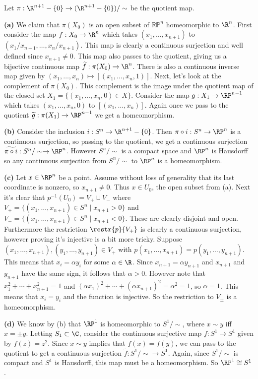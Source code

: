 \documentclass[11pt,letterpaper]{article}
\begin{document}
\begin{solution}
    Let $\pi : \R^{n+1}-\{0\} \to (\R^{n+1}-\{0\}) /\sim$ be the quotient map.

    \textbf{(a)} We claim that $\pi(X_0)$ is an open subset of $\mathbb{RP}^n$ homeomorphic to $\R^n$. First consider the map $f : X_0 \to \R^n$ which takes $(x_1,\ldots,x_{n+1})$ to $(x_1 / x_{n+1}, \ldots, x_n / x_{n+1})$. This map is clearly a continuous surjection and well defined since $x_{n+1}\neq 0$. This map also passes to the quotient, giving us a bijective continuous map $\widetilde{f} : \pi(X_0) \to \R^n$. There is also a continuous inverse map given by $(x_1,\ldots,x_n) \mapsto [(x_1,\ldots,x_n, 1)]$. Next, let's look at the complement of $\pi(X_0)$. This complement is the image under the quotient map of the closed set $X_1=\{(x_1,\ldots,x_n,0)\in X\}$. Consider the map $g : X_1 \to \RP^{n-1}$ which takes $(x_1,\ldots,x_n,0)$ to $[(x_1,\ldots,x_n)]$. Again once we pass to the quotient $\widetilde{g} : \pi(X_1) \to \RP^{n-1}$ we get a homeomorphism.    
    
    \textbf{(b)} Consider the inclusion $i : S^n \to \R^{n+1}-\{0\}$. Then $\pi\circ i : S^n \to \RP^n$ is a continuous surjection, so passing to the quotient, we get a continuous surjection $\widetilde{\pi\circ i} : S^n/\sim \to \RP^n$. However $S^n /\sim$ is a compact space and $\RP^n$ is Hausdorff so any continuous surjection from $S^n /\sim$ to $\RP^n$ is a homeomorphism.   
    
    \textbf{(c)} Let $x\in \RP^n$ be a point. Assume without loss of generality that its last coordinate is nonzero, so $x_{n+1}\neq 0$. Thus $x\in U_0$, the open subset from (a). Next it's clear that $p^{-1}(U_0)=V_+\sqcup V_-$ where $V_+=\{(x_1,\ldots,x_{n+1})\in S^n\mid x_{n+1}>0\}$ and $V_-=\{(x_1,\ldots,x_{n+1})\in S^n\mid x_{n+1}<0\}$. These are clearly disjoint and open. Furthermore the restriction $\restr{p}{V_+}$ is clearly a continuous surjection, however proving it's injective is a bit more tricky. Suppose $(x_1,\ldots,x_{n+1}), (y_1,\ldots,y_{n+1})\in V_+$ with $p(x_1,\ldots,x_{n+1})=p(y_1,\ldots,y_{n+1})$. This means that $x_i=\alpha y_{i}$ for some $\alpha\in \R$. Since $x_{n+1}=\alpha y_{n+1}$ and $x_{n+1}$ and $y_{n+1}$ have the same sign, it follows that $\alpha>0$. However note that $x_1^2+\cdots+x_{n+1}^2=1$ and $(\alpha x_1)^2+\cdots+(\alpha x_{n+1})^2=\alpha^2=1$, so $\alpha=1$. This means that $x_i=y_i$ and the function is injective. So the restriction to $V_\pm$ is a homeomorphism. 
    
    \textbf{(d)} We know by (b) that $\RP^1$ is homeomorphic to $S^1 /\sim$, where $x\sim y$ iff $x=\pm y$. Letting $S_1\subset \C$, consider the continuous surjective map $f : S^1 \to S^1$ given by $f(z)=z^2$. Since $x\sim y$ implies that $f(x)=f(y)$, we can pass to the quotient to get a continuous surjection $\widetilde{f} : S^1/\sim \to S^1$. Again, since $S^1 /\sim$ is compact and $S^1$ is Hausdorff, this map must be a homeomorphism. So $\RP^1\cong S^1$. 
\end{solution}
\end{document}
